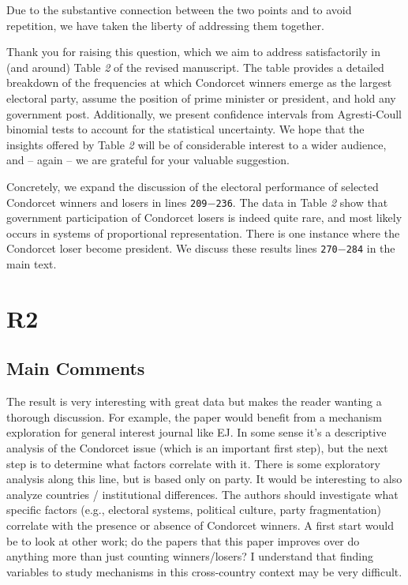 \documentclass[a4paper, 12pt]{scrartcl}
\theoremstyle{break}
\newenvironment{changes}{\par\color{violet}\par\addvspace{\baselineskip}}{\par\addvspace{\baselineskip}}
\begin{document}
Due to the substantive connection between the two points and to avoid repetition, we have taken the liberty of addressing them together.

Thank you for raising this question, which we aim to address satisfactorily in (and around) Table \textit{2} of the revised manuscript. The table provides a detailed breakdown of the frequencies at which Condorcet winners emerge as the largest electoral party, assume the position of prime minister or president, and hold any government post. Additionally, we present confidence intervals from Agresti-Coull binomial tests to account for the statistical uncertainty. We hope that the insights offered by Table \textit{2} will be of considerable interest to a wider audience, and -- again -- we are grateful for your valuable suggestion.

Concretely, we expand the discussion of the electoral performance of selected Condorcet winners and losers in lines \texttt{209$-$236}. The data in Table \textit{2} show that government participation of Condorcet losers is indeed quite rare, and most likely occurs in systems of proportional representation. There is one instance where the Condorcet loser become president. We discuss these results lines \texttt{270$-$284} in the main text.


\newpage
\section*{R2}
\subsection*{Main Comments}
\begin{changes}
	The result is very interesting with great data but makes the reader wanting a thorough discussion. For example, the paper would benefit from a mechanism exploration for general interest journal like EJ. In some sense it’s a descriptive analysis of the Condorcet issue (which is an important first step), but the next step is to determine what factors correlate with it. There is some exploratory analysis along this line, but is based only on party. It would be interesting to also analyze countries / institutional differences. The authors should investigate what specific factors (e.g., electoral systems, political culture, party fragmentation) correlate with the presence or absence of Condorcet winners. A first start would be to look at other work; do the papers
	that this paper improves over do anything more than just counting winners/losers? I understand that finding variables to study mechanisms in this cross-country context may be very difficult.
\end{changes}
\end{document}
